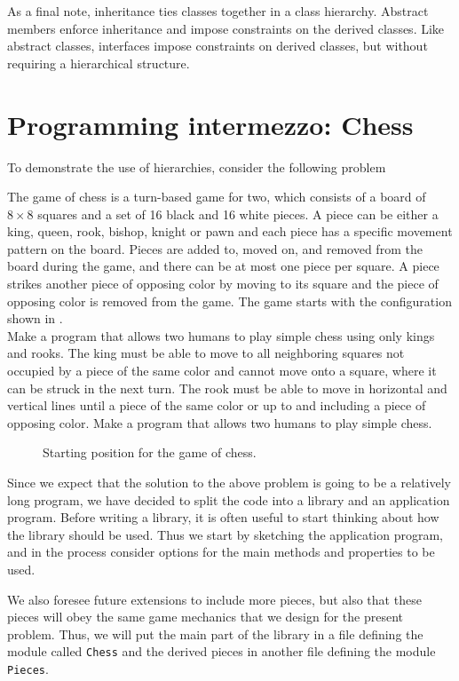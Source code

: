 As a final note, inheritance ties classes together in a class hierarchy. Abstract members enforce inheritance and impose constraints on the derived classes. Like abstract classes, interfaces impose constraints on derived classes, but without requiring a hierarchical structure.

\section{Programming intermezzo: Chess}
To demonstrate the use of hierarchies, consider the following problem
\begin{problem}
  The game of chess is a turn-based game for two, which consists of a board of $8\times 8$ squares and a set of 16 black and 16 white pieces. A piece can be either a king, queen, rook, bishop, knight or pawn and each piece has a specific movement pattern on the board. Pieces are added to, moved on, and removed from the board during the game, and there can be at most one piece per square. A piece strikes another piece of opposing color by moving to its square and the piece of opposing color is removed from the game. The game starts with the configuration shown in .\\[\parskip]

  Make a program that allows two humans to play simple chess using only kings and rooks. The king must be able to move to all neighboring squares not occupied by a piece of the same color and cannot move onto a square, where it can be struck in the next turn. The rook must be able to move in horizontal and vertical lines until a piece of the same color or up to and including a piece of opposing color. Make a program that allows two humans to play simple chess.
\end{problem}
\begin{figure}
  \centering
  \newgame
  \showboard
  \caption{Starting position for the game of chess.}
  \label{fig:chessNewGame}
\end{figure}
Since we expect that the solution to the above problem is going to be a relatively long program, we have decided to split the code into a library and an application program. Before writing a library, it is often useful to start thinking about how the library should be used. Thus we start by sketching the application program, and in the process consider options for the main methods and properties to be used.

We also foresee future extensions to include more pieces, but also that these pieces will obey the same game mechanics that we design for the present problem. Thus, we will put the main part of the library in a file defining the module called \lstinline{Chess} and the derived pieces in another file defining the module \lstinline{Pieces}.

